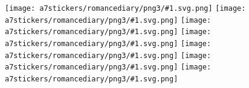 \documentclass[10pt]{article}
\newcommand{\makemyicon}[1]{\texttt{[image: a7stickers/romancediary/png3/\#1.svg.png]}} %
\begin{document}
\leavevmode\vfill



\makemyicon{bi-feather}\hfill%
\makemyicon{gg-sand-clock}\hfill%
\makemyicon{icon-park-outline-peach}\hfill%
\makemyicon{ion-hammer}\hfill%
\makemyicon{material-symbols-dark-mode-rounded}\hfill%
\makemyicon{solar-cup-bold}\hfill%
\makemyicon{tdesign-ice-cream-filled}



\end{document}
